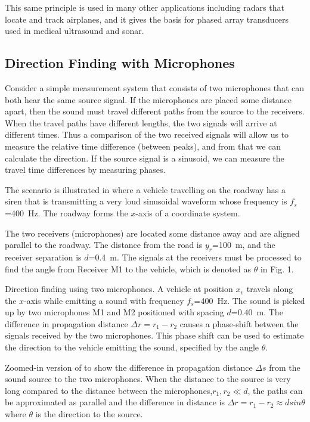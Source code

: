 This same principle is used in many other applications including radars that locate and track airplanes, and it gives the basis for phased array transducers used in medical ultrasound and sonar.

\subsection{Direction Finding with Microphones}
Consider a simple measurement system that consists of two microphones that can both hear the same source signal. If the microphones are placed some distance apart, then the sound must travel different paths from the source to the receivers. When the travel paths have different lengths, the two signals will arrive at different times. Thus a comparison of the two received signals will allow us to measure the relative time difference (between peaks), and from that we can calculate the direction. If the source signal is a sinusoid, we can measure the travel time differences by measuring phases.

The scenario is illustrated in  where a vehicle travelling on the roadway has a siren that is transmitting a very loud sinusoidal waveform whose frequency is $f_s$=\qty{400}{Hz}. The roadway forms the $x$-axis of a coordinate system.

The two receivers (microphones) are located some distance away and are aligned parallel to the roadway. The distance from the road is $y_r$=\qty{100}{m}, and the receiver separation is $d$=\qty{0.4}{m}. The signals at the receivers must be processed to find the angle from Receiver M1 to the vehicle, which is denoted as $\theta$ in Fig. 1.

\begin{stdfig}
	
	\caption{Direction finding using two microphones. A vehicle at position $x_v$ travels along the $x$-axis while emitting a sound with frequency $f_s$=\qty{400}{Hz}. The sound is picked up by two microphones M1 and M2 positioned with spacing $d$=\qty{0.40}{m}. The difference in propagation distance $\Delta r=r_1-r_2$ causes a phase-shift between the signals received by the two microphones. This phase shift can be used to estimate the direction to the vehicle emitting the sound, specified by the angle $\theta$. }
	\label{fig:overview}
\end{stdfig}

\begin{stdfig}
	
	\caption{Zoomed-in version of  to show the difference in propagation distance $\Delta s$ from the sound source to the two  microphones. When the distance to the source is very long compared to the distance between the microphones,$r_1, r_2 \ll d$, the paths can be approximated as parallel and the difference in distance is 
		$\Delta r=r_1-r_2 \approx d sin \theta$
		where $\theta$ is the direction to the source. }
	\label{fig:far_field_zoom}
\end{stdfig}


